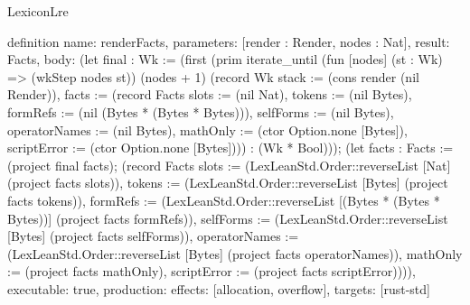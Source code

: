 \begin{lexlean}{LexiconLre}
\begin{semanticmodule}
definition{
  name: renderFacts,
  parameters: [render : Render, nodes : Nat],
  result: Facts,
  body: (let final : Wk := (first (prim iterate_until (fun [nodes] (st : Wk) => (wkStep nodes st)) (nodes + 1) (record Wk {stack := (cons render (nil Render)), facts := (record Facts {slots := (nil Nat), tokens := (nil Bytes), formRefs := (nil (Bytes * (Bytes * Bytes))), selfForms := (nil Bytes), operatorNames := (nil Bytes), mathOnly := (ctor Option.none [Bytes]), scriptError := (ctor Option.none [Bytes])})}) : (Wk * Bool))); (let facts : Facts := (project final facts); (record Facts {slots := (LexLeanStd.Order::reverseList [Nat] (project facts slots)), tokens := (LexLeanStd.Order::reverseList [Bytes] (project facts tokens)), formRefs := (LexLeanStd.Order::reverseList [(Bytes * (Bytes * Bytes))] (project facts formRefs)), selfForms := (LexLeanStd.Order::reverseList [Bytes] (project facts selfForms)), operatorNames := (LexLeanStd.Order::reverseList [Bytes] (project facts operatorNames)), mathOnly := (project facts mathOnly), scriptError := (project facts scriptError)}))),
  executable: true,
  production: {effects: [allocation, overflow], targets: [rust-std]}
}
\end{semanticmodule}
\end{lexlean}
